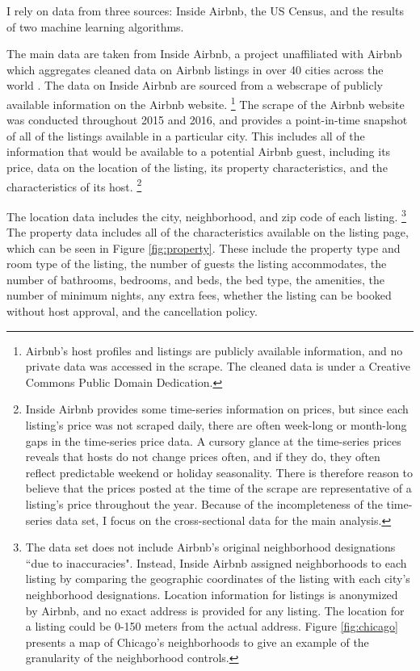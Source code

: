 
I rely on data from three sources: Inside Airbnb, the US Census, and the results of two machine learning algorithms. 

The main data are taken from Inside Airbnb, a project unaffiliated with Airbnb which aggregates cleaned data on Airbnb listings in over 40 cities across the world \citep{insideairbnb}. The data on Inside Airbnb are sourced from a webscrape of publicly available information on the Airbnb website.%
	\footnote{Airbnb's host profiles and listings are publicly available information, and no private data was accessed in the scrape. The cleaned data is under a Creative Commons Public Domain Dedication.} 
The scrape of the Airbnb website was conducted throughout 2015 and 2016, and provides a point-in-time snapshot of all of the listings available in a particular city. This includes all of the information that would be available to a potential Airbnb guest, including its price, data on the location of the listing, its property characteristics, and the characteristics of its host.%
	\footnote{Inside Airbnb provides some time-series information on prices, but since each listing's price was not scraped daily, there are often week-long or month-long gaps in the time-series price data. A cursory glance at the time-series prices reveals that hosts do not change prices often, and if they do, they often reflect predictable weekend or holiday seasonality. There is therefore reason to believe that the prices posted at the time of the scrape are representative of a listing's price throughout the year. Because of the incompleteness of the time-series data set, I focus on the cross-sectional data for the main analysis.}  

The location data includes the city, neighborhood, and zip code of each listing.%
	\footnote{The data set does not include Airbnb's original neighborhood designations ``due to inaccuracies". Instead, Inside Airbnb assigned neighborhoods to each listing by comparing the geographic coordinates of the listing with each city's neighborhood designations. Location information for listings is anonymized by Airbnb, and no exact address is provided for any listing. The location for a listing could be 0-150 meters from the actual address. Figure \ref{fig:chicago} presents a map of Chicago's neighborhoods to give an example of the granularity of the neighborhood controls.}
The property data includes all of the characteristics available on the listing page, which can be seen in Figure \ref{fig:property}. These include the property type and room type of the listing, the number of guests the listing accommodates, the number of bathrooms, bedrooms, and beds, the bed type, the amenities, the number of minimum nights, any extra fees, whether the listing can be booked without host approval, and the cancellation policy.


